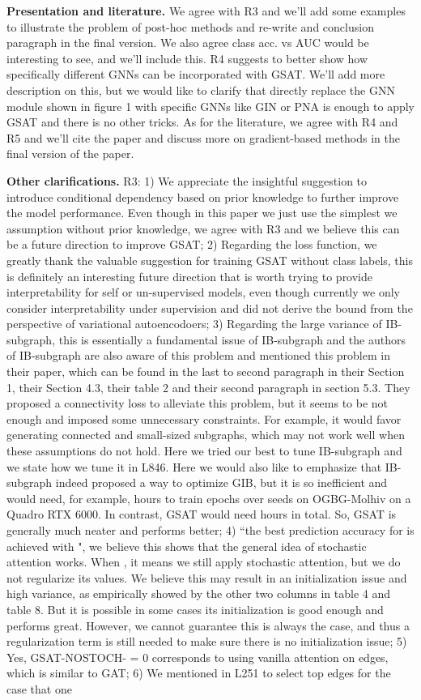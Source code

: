 \documentclass{article}
\begin{document}
\textbf{Presentation and literature.} We agree with R3 and we'll add some examples to illustrate the problem of post-hoc methods and re-write and conclusion paragraph in the final version. We also agree class acc. vs AUC would be interesting to see, and we'll include this. R4 suggests to better show how specifically different GNNs can be incorporated with GSAT. We'll add more description on this, but we would like to clarify that directly replace the GNN module shown in figure 1 with specific GNNs like GIN or PNA is enough to apply GSAT and there is no other tricks. As for the literature, we agree with R4 and R5 and we'll cite the paper and discuss more on gradient-based methods in the final version of the paper.

\textbf{Other clarifications.} R3: 1) We appreciate the insightful suggestion to introduce conditional dependency based on prior knowledge to further improve the model performance. Even though in this paper we just use the simplest we assumption without prior knowledge, we agree with R3 and we believe this can be a future direction to improve GSAT; 2) Regarding the loss function, we greatly thank the valuable suggestion for training GSAT without class labels, this is definitely an interesting future direction that is worth trying to provide interpretability for self or un-supervised models, even though currently we only consider interpretability under supervision and did not derive the bound from the perspective of variational autoencodoers; 3) Regarding the large variance of IB-subgraph, this is essentially a fundamental issue of IB-subgraph and the authors of IB-subgraph are also aware of this problem and mentioned this problem in their paper, which can be found in the last to second paragraph in their Section 1, their Section 4.3, their table 2 and their second paragraph in section 5.3. They proposed a connectivity loss to alleviate this problem, but it seems to be not enough and imposed some unnecessary constraints. For example, it would favor generating connected and small-sized subgraphs, which may not work well when these assumptions do not hold. Here we tried our best to tune IB-subgraph and we state how we tune it in L846. Here we would also like to emphasize that IB-subgraph indeed proposed a way to optimize GIB, but it is so inefficient and would need, for example,  hours to train  epochs over  seeds on OGBG-Molhiv on a Quadro RTX 6000. In contrast, GSAT would need  hours in total. So, GSAT is generally much neater and performs better; 4) ``the best prediction accuracy for  is achieved with ", we believe this shows that the general idea of stochastic attention works. When , it means we still apply stochastic attention, but we do not regularize its values. We believe this may result in an initialization issue and high variance, as empirically showed by the other two columns in table 4 and table 8. But it is possible in some cases its initialization is good enough and performs great. However, we cannot guarantee this is always the case, and thus a regularization term is still needed to make sure there is no initialization issue; 5) Yes, GSAT-NOSTOCH- = 0 corresponds to using vanilla attention on edges, which is similar to GAT; 6) We mentioned in L251 to select top edges for the case that one 
\end{document}
